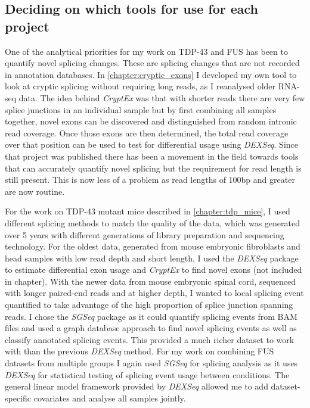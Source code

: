 
\subsection{Deciding on which tools for use for each project}

One of the analytical priorities for my work on TDP-43 and FUS has been to quantify novel splicing changes. These are splicing changes that are not recorded in annotation databases. In \autoref{chapter:cryptic_exons} I developed my own tool to look at cryptic splicing without requiring long reads, as I reanalysed older RNA-seq data. 
The idea behind \textit{CryptEx} was that with shorter reads there are very few splice junctions in an individual sample but by first combining all samples together, novel exons can be discovered and distinguished from random intronic read coverage. 
Once those exons are then determined, the total read coverage over that position can be used to test for differential usage using \textit{DEXSeq}. 
Since that project was published there has been a movement in the field towards tools that can accurately quantify novel splicing but the requirement for read length is still present.
This is now less of a problem as read lengths of 100bp and greater are now routine.

For the work on TDP-43 mutant mice described in \autoref{chapter:tdp_mice}, I used different splicing methods to match the quality of the data, which was generated over 5 years with different generations of library preparation and sequencing technology. For the oldest data, generated from mouse embryonic fibroblasts and head samples with low read depth and short length, I used the \textit{DEXSeq} package to estimate differential exon usage and \textit{CryptEx} to find novel exons (not included in chapter).
With the newer data from mouse embryonic spinal cord, sequenced with longer paired-end reads and at higher depth, I wanted to local splicing event quantified to take advantage of the high proportion of splice junction spanning reads. 
I chose the \textit{SGSeq} package as it could quantify splicing events from BAM files and used a graph database approach to find novel splicing events as well as classify annotated splicing events. This provided a much richer dataset to work with than the previous \textit{DEXSeq} method.
For my work on combining FUS datasets from multiple groups I again used \textit{SGSeq} for splicing analysis as it uses \textit{DEXSeq} for statistical testing of splicing event usage between conditions. The general linear model framework provided by \textit{DEXSeq} allowed me to add dataset-specific covariates and analyse all samples jointly.


